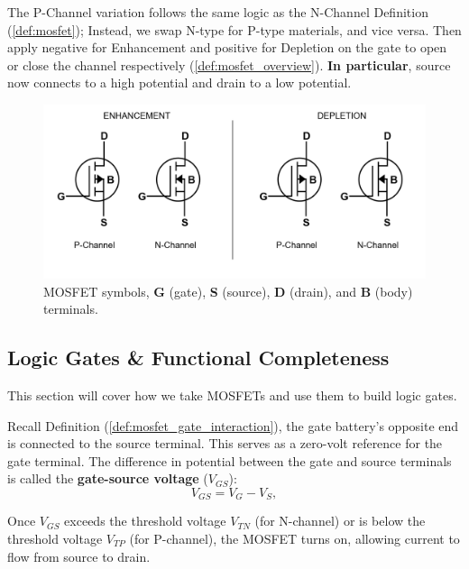 \vspace{-1em}
\begin{Def}

    \label{def:mosfet_p_channel}

    The P-Channel variation follows the same logic as the N-Channel Definition (\ref{def:mosfet});
    Instead, we swap N-type for P-type materials, and vice versa. Then apply negative for Enhancement
    and positive for Depletion on the gate to open or close the channel respectively (\ref{def:mosfet_overview}).
    \textbf{In particular}, source now connects to a high potential and drain to a low potential.

\end{Def}

\vspace{-1em}
\begin{figure}[ht!]
  \centering
    \includegraphics[width=.9\textwidth]{Sections/circuits/mosfet-symbol.png}
  \caption{MOSFET symbols, \textbf{G} (gate), \textbf{S} (source), \textbf{D} (drain), and \textbf{B} (body) terminals.}
  \label{fig:mosfet-symbol}
\end{figure}

\newpage 

\subsection{Logic Gates \& Functional Completeness}

\noindent
This section will cover how we take MOSFETs and use them to build logic gates.

\begin{Def}

  \label{def:gate_source_voltage}

  Recall Definition (\ref{def:mosfet_gate_interaction}), the gate battery's opposite end is connected to the source terminal.
  This serves as a zero-volt reference for the gate terminal.
  The difference in potential between the gate and source terminals is called the \textbf{gate-source voltage} ($V_{GS}$):
  \[
    V_{GS} = V_{G} - V_{S},
  \]
  
  \noindent
  Once $V_{GS}$ exceeds the threshold voltage $V_{TN}$ (for N-channel) or is below the threshold voltage $V_{TP}$ (for P-channel), the MOSFET turns on, allowing current to flow from source to drain.
\end{Def}

